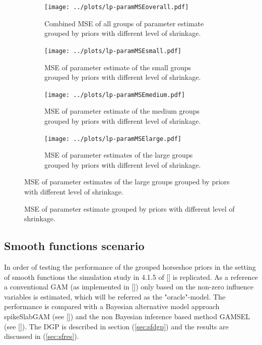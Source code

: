 \documentclass[12pt,letterpaper]{article}
\numberwithin{equation}{subsection}
\begin{document}
\begin{figure}[pbt!]
 \centering
\begin{subfigure}[b]{0.49\textwidth}
 \texttt{[image: ../plots/lp-paramMSEoverall.pdf]}
 \caption{Combined MSE of all groups of parameter estimate grouped by priors with different level of shrinkage.}
 \label{fig:lp-pmse-ov}
\end{subfigure} \hfill
\begin{subfigure}[b]{0.49\textwidth}
 \texttt{[image: ../plots/lp-paramMSEsmall.pdf]}
 \caption{MSE of parameter estimate of the small groups grouped by priors with different level of shrinkage.}
 \label{fig:lp-pmse-small}
 \end{subfigure}
 \begin{subfigure}[b]{0.49\textwidth}
 \texttt{[image: ../plots/lp-paramMSEmedium.pdf]}
 \caption{MSE of parameter estimate of the medium groups grouped by priors with different level of shrinkage.}
 \label{fig:lp-pmse-medium}
\end{subfigure} \hfill
\begin{subfigure}[b]{0.49\textwidth}
 \texttt{[image: ../plots/lp-paramMSElarge.pdf]}
 \caption{MSE of parameter estimates of the large groups grouped by priors with different level of shrinkage.}
 \label{fig:lp-pmse-large}
 \end{subfigure}
\end{figure}
\begin{figure}[pbt!]\ContinuedFloat
 \centering
 \caption[MSE of parameter estimates]{MSE of parameter estimate grouped by priors with different level of shrinkage.}
 \label{fig:lp-pmse}
\end{figure}

\FloatBarrier
\subsection{Smooth functions scenario}
In order of testing the performance of the grouped horseshoe priors in the setting of smooth functions the simulation study in 4.1.5 of [\cite{scheipl}] is replicated. As a reference a conventional GAM (as implemented in [\cite{gam}]) only based on the non-zero influence variables is estimated, which will be referred as the "oracle"-model. The performance is compared with a Bayesian alternative model approach spikeSlabGAM (see [\cite{scheipl}]) and the non Bayesian inference based method GAMSEL (see [\cite{gamsel}]). The DGP is described in section (\ref{sec:sfdgp}) and the results are discussed in (\ref{sec:sfres}).
\label{sec:sf}
\end{document}
